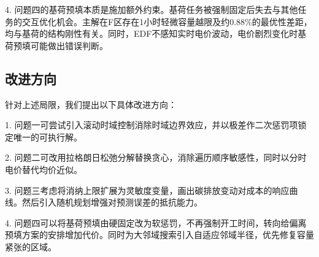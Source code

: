 4. 问题四的基荷预填本质是施加额外约束。基荷任务被强制固定后失去与其他任务的交互优化机会。主解在F区存在1小时轻微容量越限及约0.88\%的最优性差距，均与基荷的结构刚性有关。同时，EDF不感知实时电价波动，电价剧烈变化时基荷预填可能做出错误判断。

\subsection{改进方向}

针对上述局限，我们提出以下具体改进方向：

1. 问题一可尝试引入滚动时域控制消除时域边界效应，并以极差作二次惩罚项锁定唯一的可执行解。

2. 问题二可改用拉格朗日松弛分解替换贪心，消除遍历顺序敏感性，同时以分时电价替代均价近似。

3. 问题三考虑将消纳上限扩展为灵敏度变量，画出碳排放变动对成本的响应曲线。然后引入随机规划增强对预测误差的抵抗能力。

4. 问题四可以将基荷预填由硬固定改为软惩罚，不再强制开工时间，转向给偏离预填方案的安排增加代价。同时为大邻域搜索引入自适应邻域半径，优先修复容量紧张的区域。